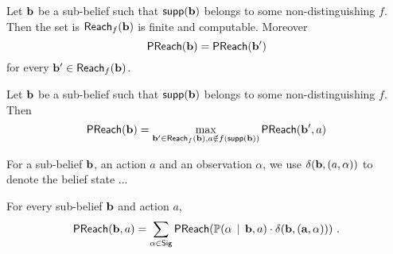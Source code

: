 %
\begin{lemma}
Let $\mathbf{b}$ be a sub-belief such that $\mathsf{supp}(\mathbf{b})$ belongs to some non-distinguishing \adscc{} $f$.
Then the set is $\mathsf{Reach}_{f}(\mathbf{b})$ is finite and computable.
Moreover
\[
\mathsf{PReach}(\mathbf{b}) = \mathsf{PReach}(\mathbf{b}')
\]
for every $\mathbf{b}' \in \mathsf{Reach}_{f}(\mathbf{b})$.
\end{lemma}
%
\begin{lemma}
Let $\mathbf{b}$ be a sub-belief such that $\mathsf{supp}(\mathbf{b})$ belongs to some non-distinguishing \adscc{} $f$.
Then
\[
\mathsf{PReach}(\mathbf{b}) =
\max_{\mathbf{b}'\in\mathsf{Reach}_{f}(\mathbf{b}),
a\notin f(\mathsf{supp}(\mathbf{b}))}
\mathsf{PReach}(\mathbf{b}',a)
\]
\end{lemma}
%
\begin{notation}
For a sub-belief $\mathbf{b}$, an action $a$ and an observation $\alpha$,
we use $\delta(\mathbf{b},(a,\alpha))$ to denote the belief state ... 
\end{notation}
%
\begin{lemma}
For every sub-belief $\mathbf{b}$ and action $a$,
\[
\mathsf{PReach}(\mathbf{b},a) =
\sum_{\alpha\in\mathsf{Sig}}
\mathsf{PReach}(\mathbb{P}(\alpha\, \mid\, \mathbf{b},a)\cdot\mathbf{\delta(\mathbf{b},(a,\alpha))}) \ .
\]
\end{lemma}
%
